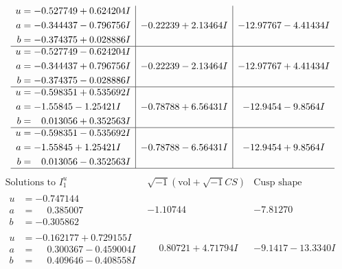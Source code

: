 \documentclass[1p]{elsarticle_modified}
\theoremstyle{definition}
\newcommand{\I}{\sqrt{-1}}
\begin{document}
$$\begin{array}{c|c|c}
\begin{aligned}
u &= -0.527749 + 0.624204 I \\
a &= -0.344437 - 0.796756 I \\
b &= -0.374375 + 0.028886 I\end{aligned}
 & -0.22239 + 2.13464 I & -12.97767 - 4.41434 I \\ \hline\begin{aligned}
u &= -0.527749 - 0.624204 I \\
a &= -0.344437 + 0.796756 I \\
b &= -0.374375 - 0.028886 I\end{aligned}
 & -0.22239 - 2.13464 I & -12.97767 + 4.41434 I \\ \hline\begin{aligned}
u &= -0.598351 + 0.535692 I \\
a &= -1.55845 - 1.25421 I \\
b &= \phantom{-}0.013056 + 0.352563 I\end{aligned}
 & -0.78788 + 6.56431 I & -12.9454 - 9.8564 I \\ \hline\begin{aligned}
u &= -0.598351 - 0.535692 I \\
a &= -1.55845 + 1.25421 I \\
b &= \phantom{-}0.013056 - 0.352563 I\end{aligned}
 & -0.78788 - 6.56431 I & -12.9454 + 9.8564 I\\
 \hline 
 \end{array}$$\newpage$$\begin{array}{c|c|c}  
\text{Solutions to }I^u_{1}& \I (\text{vol} + \sqrt{-1}CS) & \text{Cusp shape}\\
 \hline 
\begin{aligned}
u &= -0.747144\phantom{ +0.000000I} \\
a &= \phantom{-}0.385007\phantom{ +0.000000I} \\
b &= -0.305862\phantom{ +0.000000I}\end{aligned}
 & -1.10744\phantom{ +0.000000I} & -7.81270\phantom{ +0.000000I} \\ \hline\begin{aligned}
u &= -0.162177 + 0.729155 I \\
a &= \phantom{-}0.300367 - 0.459004 I \\
b &= \phantom{-}0.409646 - 0.408558 I\end{aligned}
 & \phantom{-}0.80721 + 4.71794 I & -9.1417 - 13.3340 I \\ \hline\begin{aligned}

\end{aligned}
\end{array}$$
\end{document}
